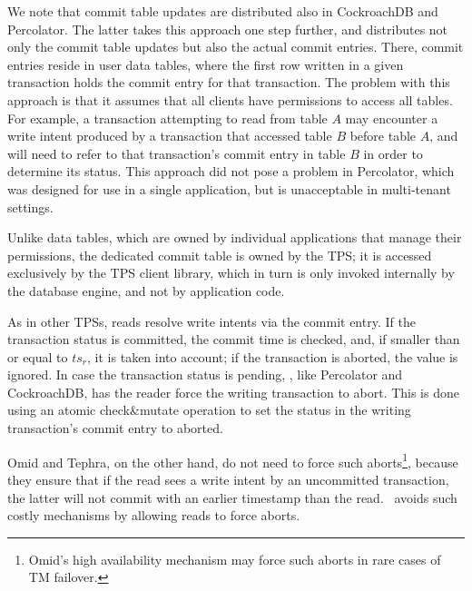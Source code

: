 We note that commit table updates are distributed also in CockroachDB and Percolator. 
The latter takes this approach one step further, and distributes not only the commit table updates 
but also the actual commit entries. There, commit entries reside in user data tables, 
where the first row written in a given transaction holds the commit entry for that transaction.
The problem with this approach is that it assumes that all clients have permissions to access all 
tables. For example, a transaction attempting to read from  table $A$ may encounter a write intent 
produced by a transaction that accessed table $B$ before table $A$, and will need to refer to 
that transaction's commit entry in table $B$ in order to determine its status. This approach 
did not pose a problem in Percolator, which was designed for use in a single application, 
but is unacceptable in multi-tenant settings.   

Unlike data tables, which are owned by individual applications that manage their permissions,  
the dedicated commit table is owned by the TPS; it is accessed exclusively by the 
TPS client library, which in turn is only invoked   internally by the database engine, and not by application code. 

{}

As in other TPSs, reads resolve write intents via the commit entry.
If the transaction status is committed, the commit time is checked, and, if smaller than or equal to $ts_r$, it is taken into account;
if the transaction is aborted, the value is ignored.
In case the transaction status is pending, \sys, like Percolator and CockroachDB, has the reader
force the writing transaction to abort. This is done using an atomic check\&mutate operation to set the status in the
writing transaction's commit entry to aborted.

Omid and Tephra, on the other hand, do not need to force such aborts\footnote{Omid's high availability mechanism  
may force such aborts in rare cases of TM failover.}, because they ensure that  if the read sees a write intent
by an uncommitted transaction, the latter will not commit with an earlier timestamp than the read.
\sysll\ avoids such costly mechanisms by allowing reads to force aborts. 




